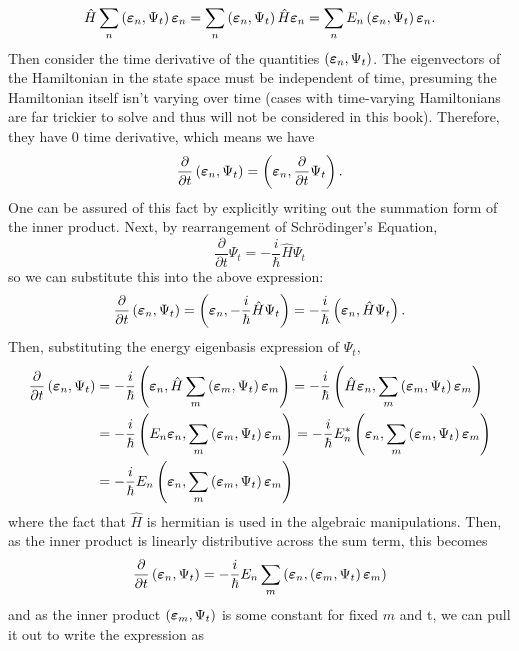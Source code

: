 $$
\hat{H}\sum_{n}\left(\bm{\varepsilon}_{n},\Psi_{t}\right)\bm{\varepsilon}_{n}=\sum_{n}\left(\bm{\varepsilon}_{n},\Psi_{t}\right)\hat{H}\bm{\varepsilon}_{n}=\sum_{n}E_{n}\left(\bm{\varepsilon}_{n},\Psi_{t}\right)\bm{\varepsilon}_{n}.
$$
Then consider the time derivative of the quantities $\left(\bm{\varepsilon}_{n},\Psi_{t}\right)$. The eigenvectors of the Hamiltonian in the state space must be independent of time, presuming the Hamiltonian itself isn't varying over time (cases with time-varying Hamiltonians are far trickier to solve and thus will not be considered in this book). Therefore, they have 0 time derivative, which means we have
$$
\frac{\partial}{\partial t}\left(\bm{\varepsilon}_{n},\Psi_{t}\right)=\left(\bm{\varepsilon}_{n},\frac{\partial}{\partial t}\Psi_{t}\right).
$$
One can be assured of this fact by explicitly writing out the summation form of the inner product. Next, by rearrangement of Schr\"{o}dinger's Equation, 
$$
\frac{\partial}{\partial t}\Psi_{t}=-\frac{i}{\hbar}\hat{H}\Psi_{t}
$$
so we can substitute this into the above expression:
$$
\frac{\partial}{\partial t}\left(\bm{\varepsilon}_{n},\Psi_{t}\right)=\left(\bm{\varepsilon}_{n},-\frac{i}{\hbar}\hat{H}\Psi_{t}\right)=-\frac{i}{\hbar}\left(\bm{\varepsilon}_{n},\hat{H}\Psi_{t}\right).
$$ 
Then, substituting the energy eigenbasis expression of $\Psi_{t}$,
$$
\begin{aligned}
\frac{\partial}{\partial t}\left(\bm{\varepsilon}_{n},\Psi_{t}\right)&=-\frac{i}{\hbar}\left(\bm{\varepsilon}_{n},\hat{H}\sum_{m}\left(\bm{\varepsilon}_{m},\Psi_{t}\right)\bm{\varepsilon}_{m}\right) =-\frac{i}{\hbar}\left(\hat{H}\bm{\varepsilon}_{n},\sum_{m}\left(\bm{\varepsilon}_{m},\Psi_{t}\right)\bm{\varepsilon}_{m}\right)\\
&=-\frac{i}{\hbar}\left(E_{n}\bm{\varepsilon}_{n},\sum_{m}\left(\bm{\varepsilon}_{m},\Psi_{t}\right)\bm{\varepsilon}_{m}\right)
=-\frac{i}{\hbar}E^{\ast}_{n}\left(\bm{\varepsilon}_{n},\sum_{m}\left(\bm{\varepsilon}_{m},\Psi_{t}\right)\bm{\varepsilon}_{m}\right)\\
&=-\frac{i}{\hbar}E_{n}\left(\bm{\varepsilon}_{n},\sum_{m}\left(\bm{\varepsilon}_{m},\Psi_{t}\right)\bm{\varepsilon}_{m}\right)
\end{aligned}
$$
where the fact that $\hat{H}$ is hermitian is used in the algebraic manipulations. Then, as the inner product is linearly distributive across the sum term, this becomes
$$
\frac{\partial}{\partial t}\left(\bm{\varepsilon}_{n},\Psi_{t}\right)=-\frac{i}{\hbar}E_{n}\sum_{m}\left(\bm{\varepsilon}_{n},\left(\bm{\varepsilon}_{m},\Psi_{t}\right)\bm{\varepsilon}_{m}\right)
$$
and as the inner product $\left(\bm{\varepsilon}_{m},\Psi_{t}\right)$ is some constant for fixed $m$ and t, we can pull it out to write the expression as
